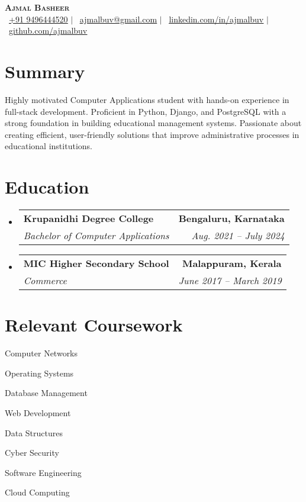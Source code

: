 \documentclass[a4paper,11pt]{article}
\makeatletter
\newcommand{\resumeSubheading}[4]{
  \vspace{-2pt}\item
    \begin{tabular*}{0.97\textwidth}[t]{l@{\extracolsep{\fill}}r}
      \textbf{#1} & \textbf{\small #2} \\
      \textit{\small#3} & \textit{\small #4} \\
    \end{tabular*}\vspace{-7pt}
}
\newcommand{\resumeSubHeadingListStart}{\begin{itemize}[leftmargin=0.15in, label={}]}
\newcommand{\resumeSubHeadingListEnd}{\end{itemize}}
\makeatother
\begin{document}
\begin{center}
	\textbf{\Huge \scshape Ajmal Basheer} \\ \vspace{1pt}
	\small{
		\raisebox{-0.1\height}\faPhone\ \href{tel:+919496444520}{\underline{+91 9496444520}} $|$ 
		\raisebox{-0.2\height}\faEnvelope\ \href{mailto:ajmalbuv@gmail.com}{\underline{ajmalbuv@gmail.com}} $|$ 
		\raisebox{-0.2\height}\faLinkedin\ \href{https://linkedin.com/in/ajmalbuv}{\underline{linkedin.com/in/ajmalbuv}} $|$
		\raisebox{-0.2\height}\faGithub\ \href{https://github.com/ajmalbuv}{\underline{github.com/ajmalbuv}}
	}
\end{center}

\section{Summary}
\begin{itemize}[leftmargin=0.15in, label={}]
	\small{\item{
			Highly motivated Computer Applications student with hands-on experience in full-stack development. Proficient in Python, Django, and PostgreSQL with a strong foundation in building educational management systems. Passionate about creating efficient, user-friendly solutions that improve administrative processes in educational institutions.
	}}
\end{itemize}
\section{Education}
\resumeSubHeadingListStart
  \resumeSubheading
    {Krupanidhi Degree College}{Bengaluru, Karnataka}
    {Bachelor of Computer Applications}{Aug. 2021 -- July 2024}
  \resumeSubheading
    {MIC Higher Secondary School}{Malappuram, Kerala}
    {Commerce}{June 2017 -- March 2019}
\resumeSubHeadingListEnd

\section{Relevant Coursework}
\begin{itemize}[leftmargin=*,nosep]
    \begin{multicols}{4}
        \item Computer Networks
        \item Operating Systems
        \item Database Management%
        \item Web Development
        \item Data Structures%
        \item Cyber Security
        \item Software Engineering
        \item Cloud Computing
    \end{multicols}
\end{itemize}
\end{document}
